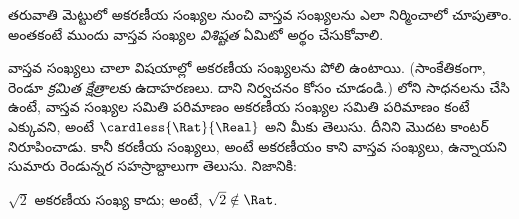 \documentclass[../../../include/open-logic-section]{subfiles}
\begin{document}

తరువాతి మెట్టులో అకరణీయ సంఖ్యల నుంచి వాస్తవ సంఖ్యలను ఎలా నిర్మించాలో
చూపుతాం. అంతకంటే ముందు వాస్తవ సంఖ్యల \emph{విశిష్టత} ఏమిటో
అర్థం చేసుకోవాలి.

వాస్తవ సంఖ్యలు చాలా విషయాల్లో అకరణీయ సంఖ్యలను పోలి ఉంటాయి.
(సాంకేతికంగా, రెండూ \emph{క్రమిత క్షేత్రాలకు} ఉదాహరణలు. దాని
నిర్వచనం కోసం  చూడండి.)
లోని సాధనలను చేసి ఉంటే,
వాస్తవ సంఖ్యల సమితి పరిమాణం అకరణీయ సంఖ్యల సమితి పరిమాణం కంటే ఎక్కువని, అంటే
$\cardless{\Rat}{\Real}$ అని మీకు తెలుసు. దీనిని మొదట కాంటర్
నిరూపించాడు. కానీ కరణీయ సంఖ్యలు, అంటే అకరణీయం కాని వాస్తవ
సంఖ్యలు, ఉన్నాయని సుమారు రెండున్నర సహస్రాబ్దాలుగా తెలుసు. నిజానికి:
\begin{thm}
$\sqrt{2}$ అకరణీయ సంఖ్య కాదు; అంటే, $\sqrt{2} \notin \Rat$.
\end{thm}
\end{document}
